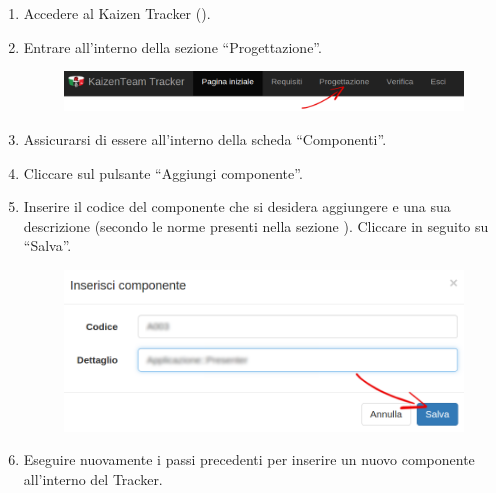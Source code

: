 					\begin{enumerate}
						\item Accedere al Kaizen  Tracker ().
						\item Entrare all'interno della sezione “Progettazione”.
						\begin{figure}[H]
							\centering
							\includegraphics[width=\textwidth]{Pics/HomePageMenuFrecciaProg}
						\end{figure}
						\item Assicurarsi di essere all'interno della scheda “Componenti”.
						\item Cliccare sul pulsante “Aggiungi componente”.
						\item Inserire il codice del componente che si desidera aggiungere e una sua descrizione (secondo le norme presenti nella sezione ). Cliccare in seguito su “Salva”.
						\begin{figure}[H]
							\centering
							\includegraphics[width=\textwidth]{Pics/InserireComponente}
						\end{figure}
						\item Eseguire nuovamente i passi precedenti per inserire un nuovo componente all'interno del Tracker.
					\end{enumerate}

